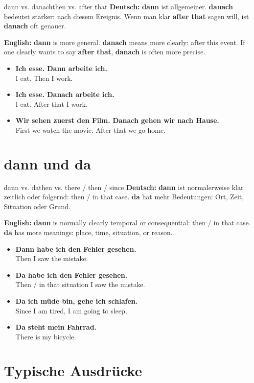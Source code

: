 \documentclass[a4paper,11pt]{article}
\newcommand{\GermanText}[1]{\textbf{Deutsch: }#1\par}
\newcommand{\EnglishText}[1]{{\small\color{SoftGray}\textbf{English: }#1\par}}
\newcommand{\ExampleItem}[2]{\item \textbf{#1}\\{\small\color{SoftGray}#2}}
\begin{document}
\begin{grammarentry}{dann vs. danach}{then vs. after that}
\GermanText{\textbf{dann} ist allgemeiner. \textbf{danach} bedeutet stärker: nach diesem Ereignis. Wenn man klar \textbf{after that} sagen will, ist \textbf{danach} oft genauer.}
\EnglishText{\textbf{dann} is more general. \textbf{danach} means more clearly: after this event. If one clearly wants to say \textbf{after that}, \textbf{danach} is often more precise.}

\begin{exbox}
\begin{itemize}
    \ExampleItem{Ich esse. Dann arbeite ich.}{I eat. Then I work.}
    \ExampleItem{Ich esse. Danach arbeite ich.}{I eat. After that I work.}
    \ExampleItem{Wir sehen zuerst den Film. Danach gehen wir nach Hause.}{First we watch the movie. After that we go home.}
\end{itemize}
\end{exbox}
\end{grammarentry}

\section{dann und da}

\begin{grammarentry}{dann vs. da}{then vs. there / then / since}
\GermanText{\textbf{dann} ist normalerweise klar zeitlich oder folgernd: then / in that case. \textbf{da} hat mehr Bedeutungen: Ort, Zeit, Situation oder Grund.}
\EnglishText{\textbf{dann} is normally clearly temporal or consequential: then / in that case. \textbf{da} has more meanings: place, time, situation, or reason.}

\begin{exbox}
\begin{itemize}
    \ExampleItem{Dann habe ich den Fehler gesehen.}{Then I saw the mistake.}
    \ExampleItem{Da habe ich den Fehler gesehen.}{Then / in that situation I saw the mistake.}
    \ExampleItem{Da ich müde bin, gehe ich schlafen.}{Since I am tired, I am going to sleep.}
    \ExampleItem{Da steht mein Fahrrad.}{There is my bicycle.}
\end{itemize}
\end{exbox}
\end{grammarentry}

\section{Typische Ausdrücke}
\end{document}
